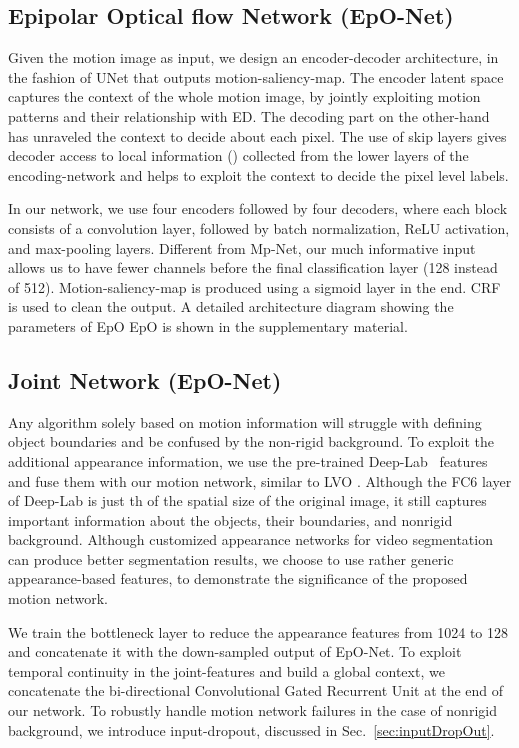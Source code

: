 \documentclass[10pt,twocolumn,letterpaper]{article}
\begin{document}
\subsection{Epipolar Optical flow Network (EpO-Net)}
Given the motion image as input, we design an encoder-decoder architecture, in the fashion of UNet \cite{uNet} that outputs motion-saliency-map.
The encoder latent space captures the context of the whole motion image, by jointly exploiting motion patterns and their relationship with ED. 
The decoding part on the other-hand has unraveled the context to decide about each pixel. 
The use of skip layers gives decoder access to local information (\cite{devildecoder}) collected from the lower layers of the encoding-network and helps to exploit the context to decide the pixel level labels. 

In our network, we use four encoders followed by four decoders, where each block consists of a convolution layer, followed by batch normalization, ReLU activation, and max-pooling layers. 
Different from Mp-Net, our much informative input allows us to have fewer channels before the final classification layer (128 instead of 512). Motion-saliency-map is produced using a sigmoid layer in the end. CRF is used to clean the output. A detailed architecture diagram showing the parameters of EpO  EpO is shown in the supplementary material. 


\subsection{Joint Network (EpO-Net)}

Any algorithm solely based on motion information will struggle with defining object boundaries and be confused by the non-rigid background. To exploit the additional appearance information, we use the pre-trained Deep-Lab~\cite{deeplab} features and fuse them with our motion network, similar to LVO \cite{visMem}. Although the FC6 layer of Deep-Lab is just th of the spatial size of the original image, it still captures important information about the objects, their boundaries, and nonrigid background. Although customized appearance networks for video segmentation can produce better segmentation results, we choose to use rather generic appearance-based features, to demonstrate the significance of the proposed motion network.

We train the bottleneck layer to reduce the appearance features from 1024 to 128 and concatenate it with the down-sampled output of EpO-Net. To exploit temporal continuity in the joint-features and build a global context, we concatenate the bi-directional Convolutional Gated Recurrent Unit at the end of our network. To robustly handle motion network failures in the case of nonrigid background, we introduce input-dropout, discussed in Sec.~\ref{sec:inputDropOut}.
 
\end{document}
